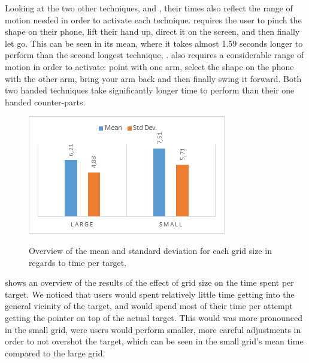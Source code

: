 Looking at the two other techniques, \pinch and \throw, their times also reflect the range of motion needed in order to activate each technique. \pinch requires the user to pinch the shape on their phone, lift their hand up, direct it on the screen, and then finally let go. This can be seen in its mean, where it takes almost 1.59 seconds longer to perform than the second longest technique, \throw. \throw also requires a considerable range of motion in order to activate: point with one arm, select the shape on the phone with the other arm, bring your arm back and then finally swing it forward. Both two handed techniques take significantly longer time to perform than their one handed counter-parts.

\begin{figure}[H]
	{\includegraphics[width = 1\columnwidth ]{images/gridTimeResults.png}} 
	\caption{
		Overview of the mean and standard deviation for each grid size in regards to time per target.
	}
	\label{fig:gridtimeResults}
\end{figure}

 shows an overview of the results of the effect of grid size on the time spent per target. We noticed that users would spent relatively little time getting into the general vicinity of the target, and would spend most of their time per attempt getting the pointer on top of the actual target. This would was more pronounced in the small grid, were users would perform smaller, more careful adjustments in order to not overshot the target, which can be seen in the small grid's mean time compared to the large grid.

